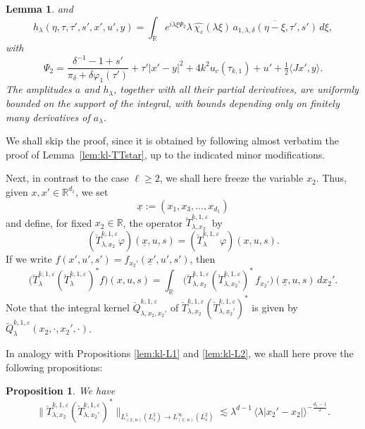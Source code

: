 \documentclass[leqno]{amsart}
\newtheorem{proposition}[theorem]{Proposition}
\newtheorem{lemma}[theorem]{Lemma}
\theoremstyle{definition}
\theoremstyle{remark}
\numberwithin{equation}{section}
\newcommand{\R}{\mathbb{R}}
\newcommand\la{{\lambda}}
\newcommand\ve{{\varepsilon}}
\newcommand\de{{\delta}}
\begin{document}
\begin{lemma}
and
\begin{equation}\label{eq:k1-hlambda}
h_\lambda(\eta,\tau,\tau',s',x',u',y)
=\int_{\R}
e^{i\lambda\xi\Psi_2}
\lambda\,\widehat{\chi_\varepsilon}(\lambda\xi)
\,\overline{a_{1,\la,\de}(\eta-\xi,\tau',s')}
\,d\xi,
\end{equation}
with
\begin{equation}\label{eq:k1-Psi2}
\Psi_2
= \frac{\delta^{-1}-1+s'}{\pi_\delta+\delta\varphi_1(\tau')}
+\tau'|x'-y|^2+4k^2u_c(\tau_{k,1})+u'
+\tfrac12\langle Jx',y\rangle.
\end{equation}
The amplitudes $a$ and $h_\lambda$, together with all their partial derivatives, are uniformly bounded on the support of the integral, with bounds depending only on finitely many derivatives of $a_\lambda$.
\end{lemma}

We shall skip the proof, since it is obtained by following almost verbatim the proof of Lemma~\ref{lem:kl-TTstar}, up to the indicated minor modifications.

\medskip

Next, in contrast to the case $\ell\ge2$, we shall here freeze the variable $x_2$. Thus, given $x,x'\in\R^{d_1}$, we set
\[
\underline x:=(x_1,x_3,\dots,x_{d_1})
\]
and define, for fixed $x_2\in\R$, the operator
$\breve T_{\lambda,x_2}^{k,1,\varepsilon}$ by
\[
(\breve T_{\lambda,x_2}^{k,1,\varepsilon}\varphi)(\underline x,u,s) = (\breve T^{k,1,\varepsilon}_\lambda \varphi)(x,u,s).
\]
If we write $f(x',u',s' ) = f_{x_2'}(\underline x',u',s')$, then
\[
\big(\breve T_\lambda^{k,1,\varepsilon} (\breve T_\lambda^{k,1,\varepsilon})^* f\big)(x, u,s)
= \int_\R \, \big( \breve T_{\lambda,x_2}^{k,1,\varepsilon} (\breve T_{\lambda,x_2'}^{k,1,\varepsilon} )^* \, f_{x_2'}\big) (\underline x,u,s) \, dx_2'.
\]
Note that the integral kernel $\breve Q_{\lambda,x_2,x_2'}^{k,1,\ve}$ of $\breve T_{\lambda,x_2}^{k,1,\varepsilon} (\breve T_{\lambda,x_2'}^{k,1,\varepsilon} )^*$ is given by $\breve Q_\lambda^{k,1,\ve}(x_2,\cdot,x_2',\cdot)$.

\smallskip

In analogy with Propositions \ref{lem:kl-L1} and \ref{lem:kl-L2}, we shall here prove the following propositions:
\begin{proposition}\label{lem:k1-L1}
We have
\[
\|\breve T_{\lambda,x_2}^{k,1,\varepsilon} (\breve T_{\lambda,x_2'}^{k,1,\varepsilon} )^* \|_{L_{(\underline x,u)}^{1}(L^2_s)\to L_{(\underline x,u)}^\infty(L^2_s)}
\lesssim \lambda^{d-1} \, \langle\lambda\left|x_2'-x_2\right|\rangle^{-\frac{d_1-1}{2}} .
\]
\end{proposition}
\end{document}
